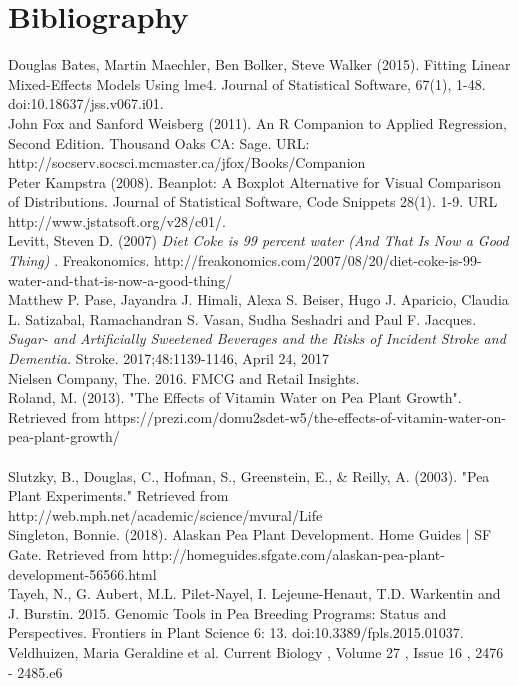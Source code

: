 \documentclass[1p,12pt]{elsarticle}\usepackage[]{graphicx}\usepackage[]{color}
\begin{document}
\newpage
\section{Bibliography}

  Douglas Bates, Martin Maechler, Ben Bolker, Steve Walker (2015). Fitting Linear Mixed-Effects Models Using lme4. Journal of Statistical Software, 67(1), 1-48. doi:10.18637/jss.v067.i01.
~ \\ 

John Fox and Sanford Weisberg (2011). An {R} Companion to Applied Regression, Second Edition. Thousand Oaks CA: Sage. URL:  http://socserv.socsci.mcmaster.ca/jfox/Books/Companion
~\\

Peter Kampstra (2008). Beanplot: A Boxplot Alternative for Visual Comparison of Distributions. Journal of Statistical Software, Code Snippets 28(1). 1-9. URL http://www.jstatsoft.org/v28/c01/.
~ \\ 


Levitt, Steven D. (2007) \textit{Diet Coke is 99 percent water (And That Is Now a Good Thing) }. Freakonomics. http://freakonomics.com/2007/08/20/diet-coke-is-99-water-and-that-is-now-a-good-thing/
~\\

Matthew P. Pase, Jayandra J. Himali, Alexa S. Beiser, Hugo J. Aparicio, Claudia L. Satizabal, Ramachandran S. Vasan, Sudha Seshadri and Paul F. Jacques. 
\textit{Sugar- and Artificially Sweetened Beverages and the Risks of Incident Stroke and Dementia.} 
Stroke. 2017;48:1139-1146, April 24, 2017
~\\

Nielsen Company, The. 2016. FMCG and Retail Insights.
~\\  

Roland, M. (2013). "The Effects of Vitamin Water on Pea Plant Growth". Retrieved from https://prezi.com/domu2sdet-w5/the-effects-of-vitamin-water-on-pea-plant-growth/ \\ 
~ \\ 

Slutzky, B., Douglas, C., Hofman, S., Greenstein, E., & Reilly, A. (2003). "Pea Plant Experiments." Retrieved from http://web.mph.net/academic/science/mvural/Life%
~ \\ 

Singleton, Bonnie. (2018). Alaskan Pea Plant Development. Home Guides | SF Gate. Retrieved from http://homeguides.sfgate.com/alaskan-pea-plant-development-56566.html
~\\

Tayeh, N., G. Aubert, M.L. Pilet-Nayel, I. Lejeune-Henaut, T.D. Warkentin and J.
Burstin. 2015. Genomic Tools in Pea Breeding Programs: Status and Perspectives.
Frontiers in Plant Science 6: 13. doi:10.3389/fpls.2015.01037.
~\\  

Veldhuizen, Maria Geraldine et al.
Current Biology , Volume 27 , Issue 16 , 2476 - 2485.e6
~\\
\end{document}
